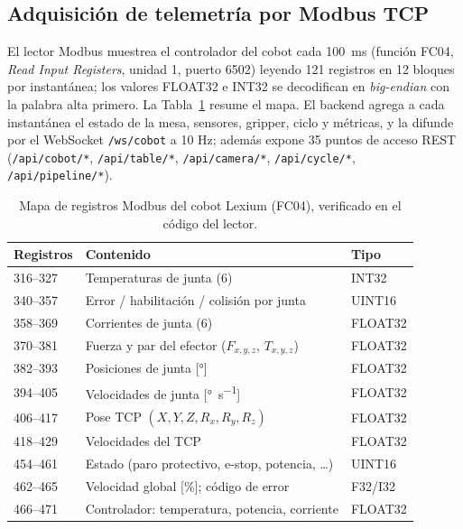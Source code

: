 \documentclass{styles/svproc}
\begin{document}
\subsection{Adquisición de telemetría por Modbus TCP}
El lector Modbus muestrea el controlador del cobot cada \SI{100}{\milli\second}
(función FC04, \emph{Read Input Registers}, unidad 1, puerto 6502) leyendo
121 registros en 12 bloques por instantánea; los valores FLOAT32 e INT32 se
decodifican en \emph{big-endian} con la palabra alta primero. La
Tabla~\ref{tab:modbus} resume el mapa. El backend agrega a cada instantánea
el estado de la mesa, sensores, gripper, ciclo y métricas, y la difunde por
el WebSocket \texttt{/ws/cobot} a 10 Hz; además expone 35 puntos de acceso
REST (\texttt{/api/cobot/*}, \texttt{/api/table/*}, \texttt{/api/camera/*},
\texttt{/api/cycle/*}, \texttt{/api/pipeline/*}).

\begin{table}[t]
  \caption{Mapa de registros Modbus del cobot Lexium (FC04), verificado en
  el código del lector.}
  \label{tab:modbus}
  \centering
  \scriptsize
  \begin{tabular}{@{}lll@{}}
    \toprule
    Registros & Contenido & Tipo \\
    \midrule
    316--327 & Temperaturas de junta (6) & INT32 \\
    340--357 & Error / habilitación / colisión por junta & UINT16 \\
    358--369 & Corrientes de junta (6) & FLOAT32 \\
    370--381 & Fuerza y par del efector ($F_{x,y,z}$, $T_{x,y,z}$) & FLOAT32 \\
    382--393 & Posiciones de junta [\si{\degree}] & FLOAT32 \\
    394--405 & Velocidades de junta [\si{\degree\per\second}] & FLOAT32 \\
    406--417 & Pose TCP $(X,Y,Z,R_x,R_y,R_z)$ & FLOAT32 \\
    418--429 & Velocidades del TCP & FLOAT32 \\
    454--461 & Estado (paro protectivo, e-stop, potencia, \ldots) & UINT16 \\
    462--465 & Velocidad global [\%]; código de error & F32/I32 \\
    466--471 & Controlador: temperatura, potencia, corriente & FLOAT32 \\
    \bottomrule
  \end{tabular}
\end{table}
\end{document}
